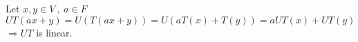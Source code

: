 Let $x, y \in V \ ,\  a \in F$
\( U T(a x+y)=U(T(a x+y))= U (a T(x)+T(y))=a U T(x)+U T(y)\)
\(\Rightarrow U T\) is linear.